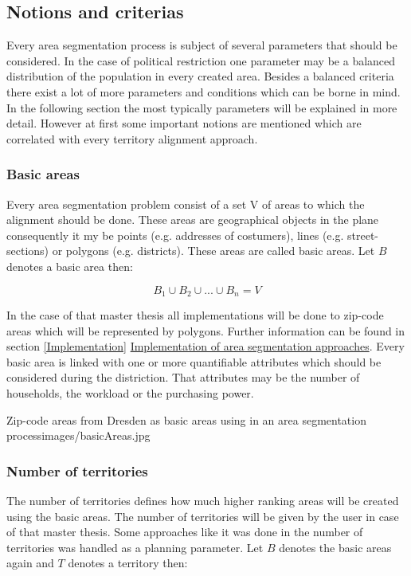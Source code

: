 \subsection{Notions and criterias}\label{notions}
Every area segmentation process is subject of several parameters that should be considered. In the case of political restriction one parameter may be a balanced distribution of the population in every created area. Besides a balanced criteria there exist a lot of more parameters and conditions which can be borne in mind. In the following section the most typically parameters will be explained in more detail. However at first some important notions are mentioned which are correlated with every territory alignment approach.

\subsubsection{Basic areas}
Every area segmentation problem consist of a set V of areas to which the alignment should be done. These areas are geographical objects in the plane consequently it my be points (e.g. addresses of costumers), lines (e.g. street-sections) or polygons (e.g. districts). These areas are called basic areas. Let $ B $ denotes a basic area then:

\[ \mathit{B_{1} \cup B_{2} \cup ... \cup B_{n}=V} \]

In the case of that master thesis all implementations will be done to zip-code areas which will be represented by polygons. Further information can be found in section \ref{Implementation} \hyperref[Implementation]{Implementation of area segmentation approaches}. Every basic area is linked with one or more quantifiable attributes which should be considered during the distriction. That attributes may be the number of households, the workload or the purchasing power.

\begin{figureOwn}{Zip-code areas from Dresden as basic areas using in an area segmentation process}{images/basicAreas.jpg}\end{figureOwn}

\subsubsection{Number of territories}
The number of territories defines how much higher ranking areas will be created using the basic areas. The number of territories will be given by the user in case of that master thesis. Some approaches like it was done in \citeauthor{kalcsics} \cite{kalcsics} the number of territories was handled as a planning parameter. Let $ B $ denotes the basic areas again and $ T $ denotes a territory then:

